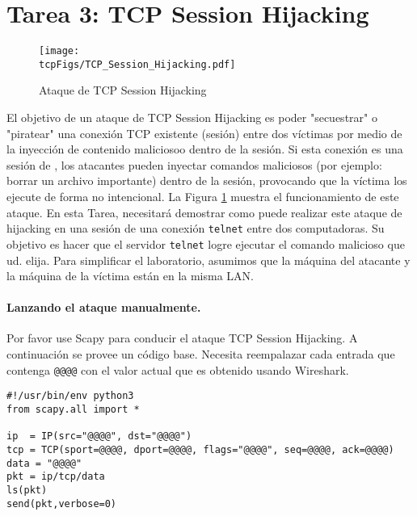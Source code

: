             


\section{Tarea 3: TCP Session Hijacking}



\begin{figure}[htb]
  \begin{center}
    \texttt{[image: \\tcpFigs/TCP\_Session\_Hijacking.pdf]}
  \end{center}
  \caption{Ataque de TCP Session Hijacking}
  \label{tcp:fig:hijacking}
\end{figure}
 
El objetivo de un ataque de TCP Session Hijacking es poder "secuestrar" o "piratear" una conexión TCP existente (sesión) entre dos víctimas por medio de la inyección de contenido maliciosoo dentro de la sesión. Si esta conexión es una sesión de \telnet, los atacantes pueden inyectar comandos maliciosos (por ejemplo: borrar un archivo importante) dentro de la sesión, provocando que la víctima los ejecute de forma no intencional. La Figura \ref{tcp:fig:hijacking} muestra el funcionamiento de este ataque.
En esta Tarea, necesitará demostrar como puede realizar este ataque de hijacking en una sesión de una conexión \texttt{telnet} entre dos computadoras. Su objetivo es hacer que el servidor \texttt{telnet} logre ejecutar el comando malicioso que ud. elija.
Para simplificar el laboratorio, asumimos que la máquina del atacante y la máquina de la víctima están en la misma LAN.


\paragraph{Lanzando el ataque manualmente.}
Por favor use Scapy para conducir el ataque TCP Session Hijacking.
A continuación se provee un código base. Necesita reempalazar cada entrada que contenga \texttt{@@@@} con el valor actual que es obtenido usando Wireshark.

\begin{lstlisting}
#!/usr/bin/env python3
from scapy.all import *

ip  = IP(src="@@@@", dst="@@@@")
tcp = TCP(sport=@@@@, dport=@@@@, flags="@@@@", seq=@@@@, ack=@@@@)
data = "@@@@"
pkt = ip/tcp/data
ls(pkt)
send(pkt,verbose=0)
\end{lstlisting}



